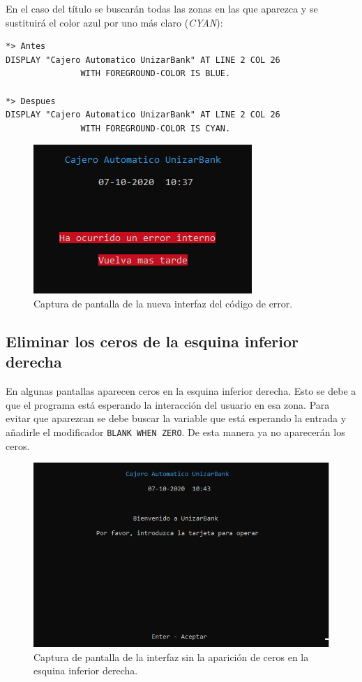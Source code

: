 \documentclass[10pt,a4paper]{article}
\begin{document}
En el caso del título se buscarán todas las zonas en las que aparezca y se sustituirá el color azul por uno más claro (\emph{CYAN}):

\begin{lstlisting}
*> Antes
DISPLAY "Cajero Automatico UnizarBank" AT LINE 2 COL 26
               WITH FOREGROUND-COLOR IS BLUE.

*> Despues
DISPLAY "Cajero Automatico UnizarBank" AT LINE 2 COL 26
               WITH FOREGROUND-COLOR IS CYAN.
\end{lstlisting}


\begin{figure}[h!]
\centering
\includegraphics[scale=0.75]{images/error.png}
\caption{Captura de pantalla de la nueva interfaz del código de error.}
\label{fig:error}
\end{figure}

\subsection{Eliminar los ceros de la esquina inferior derecha}

En algunas pantallas aparecen ceros en la esquina inferior derecha. Esto se debe a que el programa está esperando la interacción del usuario en esa zona. Para evitar que aparezcan se debe buscar la variable que está esperando la entrada y añadirle el modificador \texttt{BLANK WHEN ZERO}. De esta manera ya no aparecerán los ceros.\\

\begin{figure}[h!]
\centering
\includegraphics[scale=0.75]{images/ceros.png}
\caption{Captura de pantalla de la interfaz sin la aparición de ceros en la esquina inferior derecha.}
\label{fig:error}
\end{figure}
\end{document}
